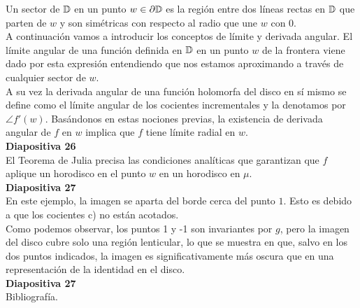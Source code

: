 \documentclass[spanish, a4paper, 12pt]{article}
\begin{document}
Un sector de $\mathbb{D}$ en un punto $w \in \partial \mathbb{D}$ es la región entre dos líneas rectas en $\mathbb{D}$ que parten de $w$ y son simétricas con respecto al radio que une $w$ con $0$. \\

A continuación vamos a introducir los conceptos de límite y derivada angular. El límite angular de una función definida en $\mathbb{D}$ en un punto $w$ de la frontera viene dado por esta expresión entendiendo que nos estamos aproximando a través de cualquier sector de $w$. \\

A su vez la derivada angular de una función holomorfa del disco en sí mismo se define como el límite angular de los cocientes incrementales y la denotamos por $\angle f'(w)$. Basándonos en estas nociones previas, la existencia de derivada angular de $f$ en $w$ implica que $f$ tiene límite radial en $w$. \\

\textbf{Diapositiva 26} \\

El Teorema de Julia precisa las condiciones analíticas que garantizan que $f$ aplique un horodisco en el punto $w$ en un horodisco en $\mu$.\\

\textbf{Diapositiva 27} \\

En este ejemplo, la imagen se aparta del borde cerca del punto $1$. Esto es debido a que los cocientes c) no están acotados. \\

Como podemos observar, los puntos 1 y -1 son invariantes por $g$, pero la imagen del disco cubre solo una región lenticular, lo que se muestra en que, salvo en los dos puntos indicados, la imagen es significativamente más oscura que en una representación de la identidad en el disco. \\

\textbf{Diapositiva 27} \\

Bibliografía. \\
\end{document}
